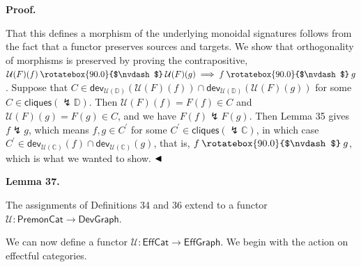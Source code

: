  
 
 
 
\par\medskip\noindent\textbf{Proof.}\par
 
 
That this defines a morphism of the underlying monoidal signatures follows from the fact that a functor preserves sources and targets. We show that orthogonality of morphisms is preserved by proving the contrapositive, $\mathcal{U}(F)(f)\mathbin{\rotatebox{90.0}{$\nvdash$}}\mathcal{U}(F)(g)\implies f\mathbin{\rotatebox{90.0}{$\nvdash$}}g$. Suppose that $C\in\mathsf{dev}_{\mathcal{U}(\mathbb{D})}(\mathcal{U}(F)(f))\cap\mathsf{dev}_{\mathcal{U}(\mathbb{D})}(\mathcal{U}(F)(g))$ for some $C\in\mathsf{cliques}({\lightning}\mathbb{D})$. Then $\mathcal{U}(F)(f)=F(f)\in C$ and $\mathcal{U}(F)(g)=F(g)\in C$, and we have $F(f)\lightning F(g)$. Then Lemma 35 gives $f\lightning g$, which means $f,g\in C^{\prime}$ for some $C^{\prime}\in\mathsf{cliques}({\lightning}\mathbb{C})$, in which case $C^{\prime}\in\mathsf{dev}_{\mathcal{U}(\mathbb{C})}(f)\cap\mathsf{dev}_{\mathcal{U}(\mathbb{C})}(g)$, that is, $f\mathbin{\rotatebox{90.0}{$\nvdash$}}g$, which is what we wanted to show. $\hfill\blacktriangleleft$\par
 
 
 
\par\medskip\noindent\textbf{Lemma 37.}\par
 
 
The assignments of Definitions 34 and 36 extend to a functor $\mathcal{U}:\mathsf{PremonCat}\to\mathsf{DevGraph}$.\par
 
 
 
 
We can now define a functor $\mathcal{U}:\mathsf{EffCat}\to\mathsf{EffGraph}$. We begin with the action on effectful categories.\par
 
 
